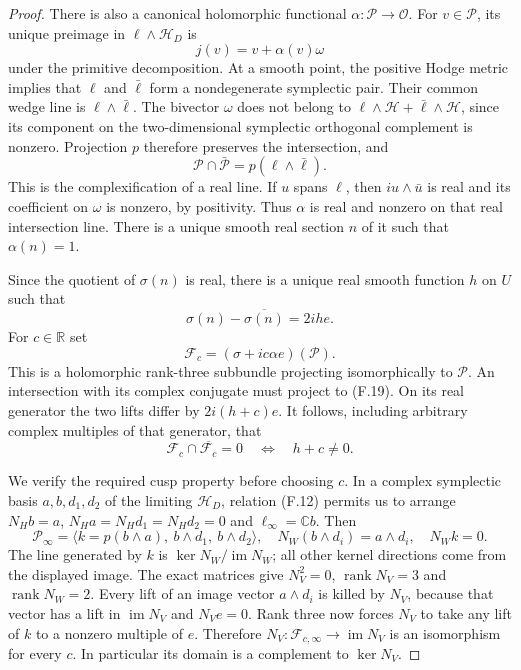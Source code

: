 \begin{proof}
There is also a canonical holomorphic functional
$\alpha:\mathcal P\to\mathcal O$.
For $v\in\mathcal P$, its unique preimage in
$\ell\wedge\mathcal H_D$ is
\[
 j(v)=v+\alpha(v)\omega
 \tag{F.18}
\]
under the primitive decomposition.
At a smooth point, the positive Hodge metric implies that
$\ell$ and $\bar\ell$ form a nondegenerate symplectic pair.
Their common wedge line is $\ell\wedge\bar\ell$.
The bivector $\omega$ does not belong to
$\ell\wedge\mathcal H+\bar\ell\wedge\mathcal H$, since its
component on the two-dimensional symplectic orthogonal complement
is nonzero.  Projection $p$ therefore preserves the intersection,
and
\[
 \mathcal P\cap\bar{\mathcal P}
      =p(\ell\wedge\bar\ell).
 \tag{F.19}
\]
This is the complexification of a real line.  If $u$ spans
$\ell$, then $i u\wedge\bar u$ is real and its coefficient on
$\omega$ is nonzero, by positivity.  Thus $\alpha$ is real and
nonzero on that real intersection line.  There is a unique smooth
real section $n$ of it such that $\alpha(n)=1$.

Since the quotient of $\sigma(n)$ is real, there is a unique
real smooth function $h$ on $U$ such that
\[
 \sigma(n)-\overline{\sigma(n)}=2ih e.
 \tag{F.20}
\]
For $c\in\mathbb R$ set
\[
 \mathcal F_c=(\sigma+ic\alpha e)(\mathcal P).
 \tag{F.21}
\]
This is a holomorphic rank-three subbundle projecting
isomorphically to $\mathcal P$.  An intersection with its complex
conjugate must project to (F.19).  On its real generator the two
lifts differ by $2i(h+c)e$.  It follows, including arbitrary
complex multiples of that generator, that
\[
 \mathcal F_c\cap\overline{\mathcal F_c}=0
       \quad\Longleftrightarrow\quad h+c\ne0.
 \tag{F.22}
\]

We verify the required cusp property before choosing $c$.
In a complex symplectic basis $a,b,d_1,d_2$ of the limiting
$\mathcal H_D$, relation (F.12) permits us to arrange
$N_Hb=a$, $N_Ha=N_Hd_1=N_Hd_2=0$ and $\ell_\infty=\mathbb Cb$.
Then
\[
 \mathcal P_\infty=
 \langle k=p(b\wedge a),\ b\wedge d_1,\ b\wedge d_2\rangle,
 \quad
 N_W(b\wedge d_i)=a\wedge d_i,
 \quad N_Wk=0.
 \tag{F.23}
\]
The line generated by $k$ is
$\ker N_W/\operatorname{im}N_W$; all other kernel directions
come from the displayed image.  The exact matrices give
$N_V^2=0$, $\operatorname{rank}N_V=3$ and
$\operatorname{rank}N_W=2$.
Every lift of an image vector $a\wedge d_i$ is killed by $N_V$,
because that vector has a lift in $\operatorname{im}N_V$ and
$N_Ve=0$.  Rank three now forces $N_V$ to take any lift of $k$
to a nonzero multiple of $e$.  Therefore
$N_V:\mathcal F_{c,\infty}\to\operatorname{im}N_V$ is an
isomorphism for every $c$.  In particular its domain is a
complement to $\ker N_V$.


\end{proof}
